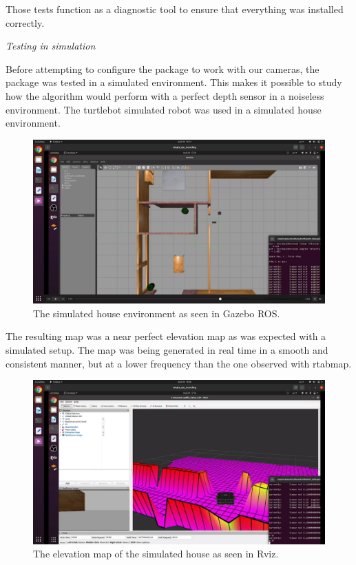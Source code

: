 \documentclass{article}
\begin{document}
Those tests function as a diagnostic tool to ensure that everything was installed correctly.

\bigskip

\textit{Testing in simulation}

\bigskip

Before attempting to configure the package to work with our cameras, the package was tested in a simulated environment. This makes it possible to study how the algorithm would perform with a perfect depth sensor in a noiseless environment. The turtlebot simulated robot was used in a simulated house environment.

\begin{figure}[h] %
    \centering
	\includegraphics[width=\textwidth,height=\textheight,keepaspectratio]{report1-img015.png} %
	\caption{The simulated house environment as seen in Gazebo ROS. }
\end{figure}

The resulting map was a near perfect elevation map as was expected with a simulated setup. The map was being generated in real time in a smooth and consistent manner, but at a lower frequency than the one observed with rtabmap.

\begin{figure}[h] %
    \centering
	\includegraphics[width=\textwidth,height=\textheight,keepaspectratio]{report1-img016.png} %
	\caption{The elevation map of the simulated house as seen in Rviz. }
\end{figure}
\end{document}
